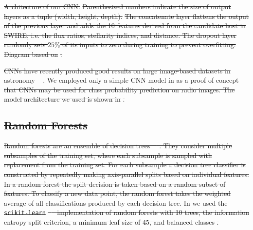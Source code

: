 \documentclass[11pt, a4paper]{book}
\providecommand{\DIFdeltex}[1]{{\protect\color{red}\sout{#1}}}                      %
\providecommand{\DIFdelFL}[1]{\DIFdel{#1}} %
\providecommand{\DIFdel}[1]{\texorpdfstring{\DIFdeltex{#1}}{}} %
\begin{document}
{%
\DIFdelFL{Architecture of our CNN. }%
\DIFdelFL{Parenthesised numbers indicate
      the size of output layers as a tuple (width, height, depth).}%
\DIFdelFL{The
      concatenate layer flattens the output of the previous layer and adds the
      10 features derived from the candidate host in SWIRE, i.e. the flux
      ratios, stellarity indices, and distance. The dropout layer randomly
      sets $25\%$ of its inputs to zero during training to prevent
      overfitting. Diagram based on }%
\DIFdelFL{.}}

\DIFdel{CNNs have recently produced good results on large image-based datasets in
    astronomy \mbox{%
\citep[e.g.]{lukic18compact, dieleman15cnn}}\hspace{0pt}%
. We employed
    only a simple CNN model in }%
\DIFdel{as a proof of concept that CNNs may
    be used for class probability prediction on radio images. The model
    architecture we used is shown in }%
\DIFdel{.
}%

\subsection{\DIFdel{Random Forests}}
\addtocounter{subsection}{-1}%

\DIFdel{Random forests are an ensemble of decision
    trees~\mbox{%
\citep{breiman01random-forest}}\hspace{0pt}%
. They consider multiple subsamples of
    the training set, where each subsample is sampled with replacement from
    the training set. For each subsample a decision tree classifier is
    constructed by repeatedly making axis-parallel splits based on individual
    features. In a random forest the split decision is taken based on a random
    subset of features. To classify a new data point, the random forest takes
    the weighted average of all classifications produced by each decision
    tree. }%
\DIFdel{In }%
\DIFdel{we used the }\texttt{\DIFdel{scikit-learn}} %
\DIFdel{\mbox{%
\citep{pedregosa11sklearn}
    }\hspace{0pt}%
implementation of random forests with 10 trees, the information entropy
    split criterion, a minimum leaf size of 45, and balanced classes}%
\DIFdel{.
}%
\end{document}
